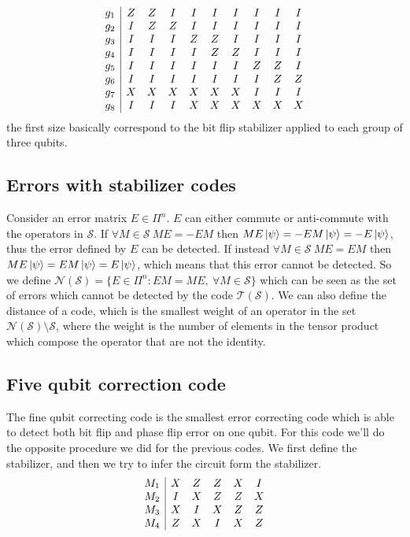 \documentclass{article}
\begin{document}
	\[
	\begin{array}{c|c c c c c c c c c }
		g_1 & Z & Z & I & I & I & I & I & I & I \\
		g_2 & I & Z & Z & I & I & I & I & I & I \\
		g_3 & I & I & I & Z & Z & I & I & I & I \\
		g_4 & I & I & I & I & Z & Z & I & I & I \\
		g_5 & I & I & I & I & I & I & Z & Z & I \\
		g_6 & I & I & I & I & I & I & I & Z & Z \\
		g_7 & X & X & X & X & X & X & I & I & I \\
		g_8 & I & I & I & X & X & X & X & X & X \\
	\end{array}
	\]
	the first size basically correspond to the bit flip stabilizer applied to each group of three qubits. 
	
	\subsection{Errors with stabilizer codes}
	 Consider an error matrix $E \in \Pi^n$. $E$ can either commute or anti-commute with the operators in $\mathcal{S}$. If $\forall M \in \mathcal{S}\ ME = -EM$ then $ME\ket{\psi} = -EM\ket{\psi} = -E\ket{\psi}$, thus the error defined by $E$ can be detected. If instead $\forall M \in \mathcal{S}\ ME = EM$ then $ME\ket{\psi} = EM\ket{\psi} = E\ket{\psi}$, which means that this error cannot be detected. So we define $\mathcal{N}(\mathcal{S}) = \{E \in \Pi^n \colon EM = ME, \ \forall M \in \mathcal{S}\}$ which can be seen as the set of errors which cannot be detected by the code $\mathcal{T}(\mathcal{S})$. We can also define the distance of a code, which is the smallest weight of an operator in the set $\mathcal{N}(\mathcal{S}) \setminus \mathcal{S}$, where the weight is the number of elements in the tensor product which compose the operator that are not the identity. 
	
	
	
	\subsection{Five qubit correction code}
	The fine qubit correcting code is the smallest error correcting code which is able to detect both bit flip and phase flip error on one qubit. For this code we'll do the opposite procedure we did for the previous codes. We first define the stabilizer, and then we try to infer the circuit form the stabilizer. 
	\[
	\begin{array}{c|c c c c c}
		M_1 & X & Z & Z & X & I \\
		M_2 & I & X & Z & Z & X \\
		M_3 & X & I & X & Z & Z \\
		M_4 & Z & X & I & X & Z \\
	\end{array}
	\]
	
	\newpage
	
	
\end{document}

